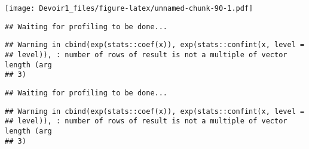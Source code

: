 \documentclass[]{article}
\newenvironment{Shaded}{\begin{snugshade}}{\end{snugshade}}
\newcommand{\KeywordTok}[1]{\textcolor[rgb]{0.13,0.29,0.53}{\textbf{#1}}}
\newcommand{\DataTypeTok}[1]{\textcolor[rgb]{0.13,0.29,0.53}{#1}}
\newcommand{\DecValTok}[1]{\textcolor[rgb]{0.00,0.00,0.81}{#1}}
\newcommand{\StringTok}[1]{\textcolor[rgb]{0.31,0.60,0.02}{#1}}
\newcommand{\OperatorTok}[1]{\textcolor[rgb]{0.81,0.36,0.00}{\textbf{#1}}}
\newcommand{\NormalTok}[1]{#1}
\begin{document}
\texttt{[image: Devoir1\_files/figure-latex/unnamed-chunk-90-1.pdf]}

\begin{Shaded}
\end{Shaded}

\begin{verbatim}
## Waiting for profiling to be done...
\end{verbatim}

\begin{verbatim}
## Warning in cbind(exp(stats::coef(x)), exp(stats::confint(x, level =
## level)), : number of rows of result is not a multiple of vector length (arg
## 3)
\end{verbatim}

\begin{verbatim}
## Waiting for profiling to be done...
\end{verbatim}

\begin{verbatim}
## Warning in cbind(exp(stats::coef(x)), exp(stats::confint(x, level =
## level)), : number of rows of result is not a multiple of vector length (arg
## 3)
\end{verbatim}
\end{document}
